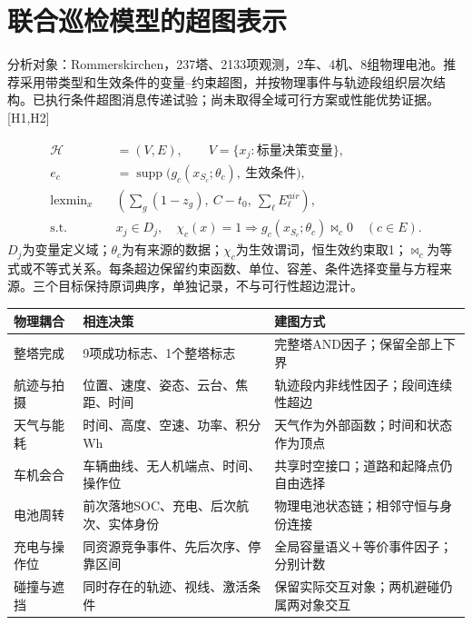 \section*{联合巡检模型的超图表示}
\noindent 分析对象：Rommerskirchen，237塔、2133项观测，2车、4机、8组物理电池。推荐采用带类型和生效条件的变量--约束超图，并按物理事件与轨迹段组织层次结构。已执行条件超图消息传递试验；尚未取得全域可行方案或性能优势证据。[H1,H2]

\begin{align*}
 \mathcal H&=(V,E),\qquad V=\{x_j:\text{标量决策变量}\},\\
 e_c&=\operatorname{supp}\bigl(g_c(x_{S_c};\theta_c),\ \text{生效条件}\bigr),\\
 \operatorname{lexmin}_x\quad &\left(\sum_g(1-z_g),\ C-t_0,\ \sum_\ell E_\ell^{air}\right),\\
 \text{s.t.}\quad &x_j\in D_j,\quad \chi_c(x)=1\Rightarrow g_c(x_{S_c};\theta_c)\bowtie_c0\quad(c\in E).
\end{align*}
\noindent $D_j$为变量定义域；$\theta_c$为有来源的数据；$\chi_c$为生效谓词，恒生效约束取1；$\bowtie_c$为等式或不等式关系。每条超边保留约束函数、单位、容差、条件选择变量与方程来源。三个目标保持原词典序，单独记录，不与可行性超边混计。

\begin{center}\small
\begin{tabular}{p{24mm}p{58mm}p{63mm}}\toprule
物理耦合 & 相连决策 & 建图方式\\\midrule
整塔完成 & 9项成功标志、1个整塔标志 & 完整塔AND因子；保留全部上下界\\
航迹与拍摄 & 位置、速度、姿态、云台、焦距、时间 & 轨迹段内非线性因子；段间连续性超边\\
天气与能耗 & 时间、高度、空速、功率、积分Wh & 天气作为外部函数；时间和状态作为顶点\\
车机会合 & 车辆曲线、无人机端点、时间、操作位 & 共享时空接口；道路和起降点仍自由选择\\
电池周转 & 前次落地SOC、充电、后次航次、实体身份 & 物理电池状态链；相邻守恒与身份连接\\
充电与操作位 & 同资源竞争事件、先后次序、停靠区间 & 全局容量语义＋等价事件因子；分别计数\\
碰撞与遮挡 & 同时存在的轨迹、视线、激活条件 & 保留实际交互对象；两机避碰仍属两对象交互\\\bottomrule
\end{tabular}\end{center}

